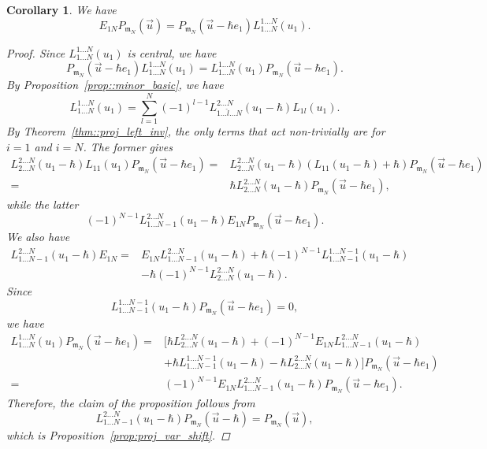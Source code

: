 \documentclass[10pt,a4paper]{article}
\numberwithin{equation}{section}
\newtheorem{Corollary}[Theorem]{Corollary}
\newcommand{\m}{\mathfrak{m}}
\begin{document}
	\begin{Corollary}
		\label{prop::kirillov_proj_e1n}
		We have
		\[
		E_{1N} P_{\m_N}(\vec{u})= P_{\m_N} (\vec{u} - \hbar e_1) L_{1\dots N}^{1\dots N}(u_1).
		\]
		\begin{proof}
			Since $L_{1\dots N}^{1\dots N}(u_1)$ is central, we have
			\[
			P_{\m_N}(\vec{u}-\hbar e_1) L_{1\dots N}^{1\dots N}(u_1) = L_{1\dots N}^{1\dots N}(u_1) P_{\m_N}(\vec{u}-\hbar e_1).
			\]
			By Proposition~\ref{prop::minor_basic}, we have
			\[
			L_{1\dots N}^{1\dots N}(u_1) = \sum\limits_{l=1}^N (-1)^{l-1} L_{1\dots \hat{l}\dots N}^{2\dots N} (u_1-\hbar) L_{1l}(u_1).
			\]
			By Theorem~\ref{thm::proj_left_inv}, the only terms that act non-trivially are for $i=1$ and $i=N$. The former gives
			\begin{align*}
				L_{2\dots N}^{2\dots N}(u_1-\hbar) L_{11}(u_1) P_{\m_N}(\vec{u}-\hbar e_1)
				={}&L_{2\dots N}^{2\dots N}(u_1-\hbar) (L_{11}(u_1-\hbar) + \hbar) P_{\m_N}(\vec{u}-\hbar e_1) \\
				={}&\hbar L_{2\dots N}^{2\dots N}(u_1-\hbar)P_{\m_N}(\vec{u}-\hbar e_1),
			\end{align*}
			while the latter
			\[
			(-1)^{N-1} L_{1\dots N-1}^{2\dots N}(u_1-\hbar) E_{1N} P_{\m_N}(\vec{u}-\hbar e_1).
			\]
			We also have
			\begin{align*}
			L_{1\dots N-1}^{2\dots N}(u_1-\hbar) E_{1N} ={}& E_{1N} L_{1\dots N-1}^{2\dots N}(u_1-\hbar) + \hbar (-1)^{N-1} L_{1\dots N-1}^{1\dots N-1}(u_1-\hbar)\\& - \hbar (-1)^{N-1} L_{2\dots N}^{2\dots N}(u_1-\hbar).
			\end{align*}
			Since
			\[
			L_{1\dots N-1}^{1\dots N-1}(u_1-\hbar) P_{\m_N}(\vec{u}-\hbar e_1) = 0,
			\]
			we have
			\begin{align*}
				L_{1\dots N}^{1\dots N}(u_1) P_{\m_N}(\vec{u}-\hbar e_1)
				={}& \bigl[\hbar L_{2\dots N}^{2\dots N}(u_1-\hbar)+ (-1)^{N-1} E_{1N} L_{1\dots N-1}^{2\dots N}(u_1-\hbar) \\
				&+ \hbar L_{1\dots N-1}^{1\dots N-1}(u_1-\hbar) - \hbar L_{2\dots N}^{2\dots N}(u_1-\hbar)\bigr] P_{\m_N}(\vec{u}-\hbar e_1) \\
				= {}&(-1)^{N-1} E_{1N} L_{1\dots N-1}^{2\dots N}(u_1-\hbar) P_{\m_N}(\vec{u}-\hbar e_1).
			\end{align*}
			Therefore, the claim of the proposition follows from
			\[
			L_{1\dots N-1}^{2\dots N}(u_1-\hbar) P_{\m_N}(\vec{u}-\hbar) = P_{\m_N}(\vec{u}),
			\]
			which is Proposition~\ref{prop:proj_var_shift}.
		\end{proof}
	\end{Corollary}
	
\end{document}
